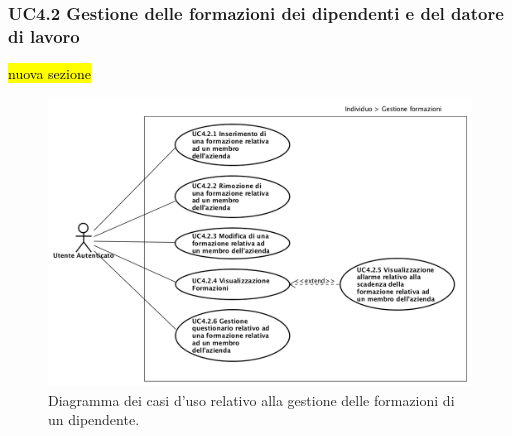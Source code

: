 	\subsubsection{UC4.2 Gestione delle formazioni dei dipendenti e del datore di lavoro }
		\hl{nuova sezione}\\
		\begin{figure}[H]
			\begin{center}
				\includegraphics[width=16cm]{Pics/UC4_2GestioneFormazioni.png}
				\caption{Diagramma dei casi d'uso relativo alla gestione delle formazioni di un dipendente.}
				\label{fig:UC4_2_Formazioni}
			\end{center}
		\end{figure}
		
